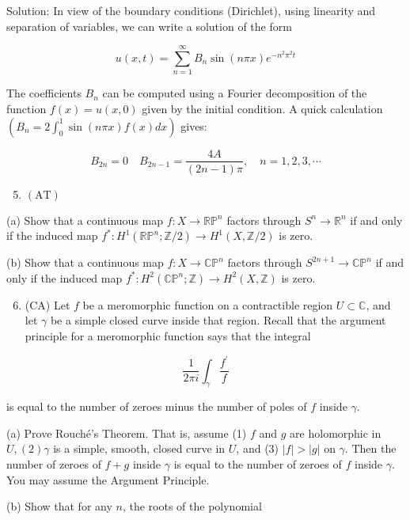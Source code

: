 \documentclass[10pt]{article}
\begin{document}
Solution: In view of the boundary conditions (Dirichlet), using linearity and separation of variables, we can write a solution of the form

$$
u(x, t)=\sum_{n=1}^{\infty} B_{n} \sin (n \pi x) e^{-n^{2} \pi^{2} t}
$$

The coefficients $B_{n}$ can be computed using a Fourier decomposition of the function $f(x)=u(x, 0)$ given by the initial condition. A quick calculation $\left(B_{n}=2 \int_{0}^{1} \sin (n \pi x) f(x) d x\right)$ gives:

$$
B_{2 n}=0 \quad B_{2 n-1}=\frac{4 A}{(2 n-1) \pi}, \quad n=1,2,3, \cdots
$$

\begin{enumerate}
  \setcounter{enumi}{4}
  \item $(\mathrm{AT})$
\end{enumerate}

(a) Show that a continuous map $f: X \rightarrow \mathbb{R P}^{n}$ factors through $S^{n} \rightarrow \mathbb{R}^{n}$ if and only if the induced map $f^{*}: H^{1}\left(\mathbb{R P}^{n} ; \mathbb{Z} / 2\right) \rightarrow H^{1}(X, \mathbb{Z} / 2)$ is zero.

(b) Show that a continuous map $f: X \rightarrow \mathbb{C P}^{n}$ factors through $S^{2 n+1} \rightarrow \mathbb{C P}^{n}$ if and only if the induced map $f^{*}: H^{2}\left(\mathbb{C P}^{n} ; \mathbb{Z}\right) \rightarrow H^{2}(X, \mathbb{Z})$ is zero.

\begin{enumerate}
  \setcounter{enumi}{5}
  \item (CA) Let $f$ be a meromorphic function on a contractible region $U \subset \mathbb{C}$, and let $\gamma$ be a simple closed curve inside that region. Recall that the argument principle for a meromorphic function says that the integral
\end{enumerate}

$$
\frac{1}{2 \pi i} \int_{\gamma} \frac{f^{\prime}}{f}
$$

is equal to the number of zeroes minus the number of poles of $f$ inside $\gamma$.

(a) Prove Rouché's Theorem. That is, assume (1) $f$ and $g$ are holomorphic in $U,(2) \gamma$ is a simple, smooth, closed curve in $U$, and (3) $|f|>|g|$ on $\gamma$. Then the number of zeroes of $f+g$ inside $\gamma$ is equal to the number of zeroes of $f$ inside $\gamma$. You may assume the Argument Principle.

(b) Show that for any $n$, the roots of the polynomial
\end{document}

